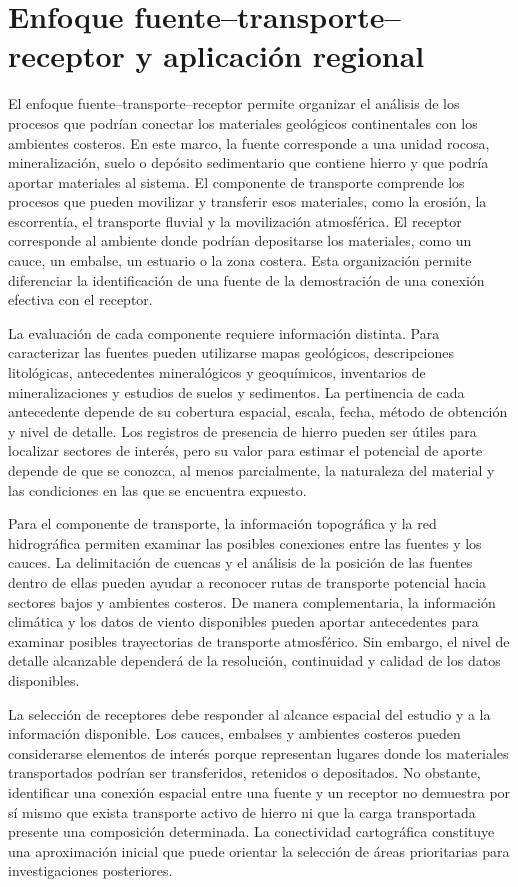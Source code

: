 \section{Enfoque fuente--transporte--receptor y aplicación regional}

El enfoque fuente--transporte--receptor permite organizar el análisis de los procesos que podrían conectar los materiales geológicos continentales con los ambientes costeros. En este marco, la fuente corresponde a una unidad rocosa, mineralización, suelo o depósito sedimentario que contiene hierro y que podría aportar materiales al sistema. El componente de transporte comprende los procesos que pueden movilizar y transferir esos materiales, como la erosión, la escorrentía, el transporte fluvial y la movilización atmosférica. El receptor corresponde al ambiente donde podrían depositarse los materiales, como un cauce, un embalse, un estuario o la zona costera. Esta organización permite diferenciar la identificación de una fuente de la demostración de una conexión efectiva con el receptor.

La evaluación de cada componente requiere información distinta. Para caracterizar las fuentes pueden utilizarse mapas geológicos, descripciones litológicas, antecedentes mineralógicos y geoquímicos, inventarios de mineralizaciones y estudios de suelos y sedimentos. La pertinencia de cada antecedente depende de su cobertura espacial, escala, fecha, método de obtención y nivel de detalle. Los registros de presencia de hierro pueden ser útiles para localizar sectores de interés, pero su valor para estimar el potencial de aporte depende de que se conozca, al menos parcialmente, la naturaleza del material y las condiciones en las que se encuentra expuesto.

Para el componente de transporte, la información topográfica y la red hidrográfica permiten examinar las posibles conexiones entre las fuentes y los cauces. La delimitación de cuencas y el análisis de la posición de las fuentes dentro de ellas pueden ayudar a reconocer rutas de transporte potencial hacia sectores bajos y ambientes costeros. De manera complementaria, la información climática y los datos de viento disponibles pueden aportar antecedentes para examinar posibles trayectorias de transporte atmosférico. Sin embargo, el nivel de detalle alcanzable dependerá de la resolución, continuidad y calidad de los datos disponibles.

La selección de receptores debe responder al alcance espacial del estudio y a la información disponible. Los cauces, embalses y ambientes costeros pueden considerarse elementos de interés porque representan lugares donde los materiales transportados podrían ser transferidos, retenidos o depositados. No obstante, identificar una conexión espacial entre una fuente y un receptor no demuestra por sí mismo que exista transporte activo de hierro ni que la carga transportada presente una composición determinada. La conectividad cartográfica constituye una aproximación inicial que puede orientar la selección de áreas prioritarias para investigaciones posteriores.

